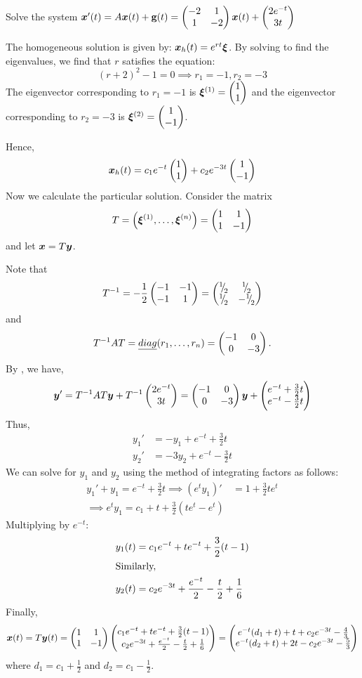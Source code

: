 \begin{eg}\label{eg:nonhom}
	Solve the system $\bm{x}'(t) = A \bm{x}(t) + \textbf{g}(t) = \begin{pmatrix}-2 & 1 \\ 1 & -2\end{pmatrix} \bm{x}(t) + \begin{pmatrix}2 e^{-t} \\ 3t\end{pmatrix}$
	
	The homogeneous solution is given by: $\bm{x}_h(t) = e^{rt} \bm{\xi}$. By solving to find the eigenvalues, we find that $r$ satisfies the equation:
	\[
	(r+2)^2 -1=0 \implies r_1 = -1, r_2 = -3
	\] 
	The eigenvector corresponding to $r_1 = -1$ is $\bm{\xi}^{(1)} = \begin{pmatrix}1 \\ 1\end{pmatrix}$ and the eigenvector corresponding to $r_2 = -3$ is $\bm{\xi}^{(2)} = \begin{pmatrix}1 \\ -1\end{pmatrix}$. 
	
	Hence,
	\[
	\bm{x}_h(t) = c_1 e^{-t} \begin{pmatrix}1 \\ 1\end{pmatrix} + c_2 e^{-3t} \begin{pmatrix}1 \\ -1\end{pmatrix}
	\]
	Now we calculate the particular solution. Consider the matrix
	\[
	T = \left(\bm{\xi}^{(1)}, \ldots, \bm{\xi}^{(n)}\right) = \begin{pmatrix}1 &1 \\ 1 &-1\end{pmatrix}
	\]
	and let $\bm{x} = T \bm{y}$.
	
	Note that 
	\[
	T^{-1} = -\frac{1}{2} \begin{pmatrix}-1 & -1 \\ -1 & 1\end{pmatrix} = \begin{pmatrix}{}^{1}{\mskip -5mu/\mskip -3mu}_{2} & {}^{1}{\mskip -5mu/\mskip -3mu}_{2} \\ {}^{1}{\mskip -5mu/\mskip -3mu}_{2} & -{}^{1}{\mskip -5mu/\mskip -3mu}_{2}\end{pmatrix}
	\] 
	and 
	\[
	T^{-1} A T = \emph{diag}(r_1,\ldots,r_n) = \begin{pmatrix}-1 & 0 \\0 & -3\end{pmatrix}. 
	\]
	By , we have,
	\[
	\bm{y}' = T^{-1} A T \bm{y} + T^{-1} \begin{pmatrix}2 e^{-t} \\ 3t\end{pmatrix} = \begin{pmatrix}-1 & 0 \\0 & -3\end{pmatrix} \bm{y} + \begin{pmatrix}e^{-t}+\frac{3}{2}t \\ e^{-t}-\frac{3}{2}t\end{pmatrix}
	\]
	Thus,
	\begin{align*}
		y_1' &= -y_1 + e^{-t} +\frac{3}{2}t \\
		y_2' &= -3y_2 + e^{-t} -\frac{3}{2}t
	\end{align*}
	We can solve for $y_1$ and $y_2$ using the method of integrating factors as follows:
	\begin{align*}
		y_1'+y_1 = e^{-t} +\frac{3}{2}t \implies (e^ty_1)' &= 1 + \frac{3}{2}te^t \\
		\implies e^ty_1 = c_1 + t + \frac{3}{2}(te^t - e^t)
	\end{align*}
	Multiplying by $e^{-t}$:
	\begin{align}
		y_1(t) &= c_1 e^{-t} + t e^{-t} + \frac{3}{2}(t-1) \\
		\intertext{Similarly,}
		y_2(t) &= c_2e^{-3t} + \frac{e^{-t}}{2} - \frac{t}{2} + \frac{1}{6}
	\end{align}
	Finally,
	\[
	\bm{x}(t) = T \bm{y}(t) = \begin{pmatrix}1 &1 \\ 1 &-1\end{pmatrix} \begin{pmatrix}c_1 e^{-t} + t e^{-t} + \frac{3}{2}(t-1) \\ c_2e^{-3t} + \frac{e^{-t}}{2} - \frac{t}{2} + \frac{1}{6}\end{pmatrix} = \begin{pmatrix}e^{-t}(d_1 + t) + t + c_2e^{-3t} - \frac{4}{3} \\ e^{-t}(d_2 + t) + 2t - c_2e^{-3t} - \frac{5}{3}\end{pmatrix}
	\]
	where $d_1 = c_1 + \frac{1}{2}$ and $d_2 = c_1 - \frac{1}{2}$.
\end{eg}

